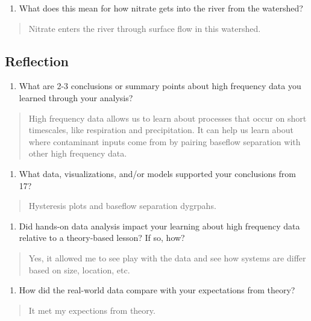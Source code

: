 \documentclass[]{article}
\providecommand{\tightlist}{%
  \setlength{\itemsep}{0pt}\setlength{\parskip}{0pt}}
\begin{document}
\begin{enumerate}
\def\labelenumi{\arabic{enumi}.}
\setcounter{enumi}{15}
\tightlist
\item
  What does this mean for how nitrate gets into the river from the
  watershed?
\end{enumerate}

\begin{quote}
Nitrate enters the river through surface flow in this watershed.
\end{quote}

\hypertarget{reflection}{%
\subsection{Reflection}\label{reflection}}

\begin{enumerate}
\def\labelenumi{\arabic{enumi}.}
\setcounter{enumi}{16}
\tightlist
\item
  What are 2-3 conclusions or summary points about high frequency data
  you learned through your analysis?
\end{enumerate}

\begin{quote}
High frequency data allows us to learn about processes that occur on
short timescales, like respiration and precipitation. It can help us
learn about where contaminant inputs come from by pairing baseflow
separation with other high frequency data.
\end{quote}

\begin{enumerate}
\def\labelenumi{\arabic{enumi}.}
\setcounter{enumi}{17}
\tightlist
\item
  What data, visualizations, and/or models supported your conclusions
  from 17?
\end{enumerate}

\begin{quote}
Hysteresis plots and baseflow separation dygrpahs.
\end{quote}

\begin{enumerate}
\def\labelenumi{\arabic{enumi}.}
\setcounter{enumi}{18}
\tightlist
\item
  Did hands-on data analysis impact your learning about high frequency
  data relative to a theory-based lesson? If so, how?
\end{enumerate}

\begin{quote}
Yes, it allowed me to see play with the data and see how systems are
differ based on size, location, etc.
\end{quote}

\begin{enumerate}
\def\labelenumi{\arabic{enumi}.}
\setcounter{enumi}{19}
\tightlist
\item
  How did the real-world data compare with your expectations from
  theory?
\end{enumerate}

\begin{quote}
It met my expections from theory.
\end{quote}
\end{document}
